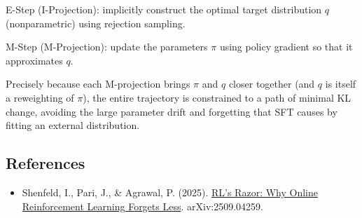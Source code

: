 E-Step (I-Projection): implicitly construct the optimal target distribution \(q\) (nonparametric) using rejection sampling.

M-Step (M-Projection): update the parameters \(\pi\) using policy gradient so that it approximates \(q\).

Precisely because each M-projection brings \(\pi\) and \(q\) closer together (and \(q\) is itself a reweighting of \(\pi\)), the entire trajectory is constrained to a path of minimal KL change, avoiding the large parameter drift and forgetting that SFT causes by fitting an external distribution.

\FloatBarrier
{}
\hypertarget{references-87}{%
\subsection{References}\label{references-87}}

\vspace{0.25em}
\begin{itemize}
\tightlist
\item
  Shenfeld, I., Pari, J., \& Agrawal, P. (2025). \href{https://arxiv.org/abs/2509.04259}{RL's Razor: Why Online Reinforcement Learning Forgets Less}. arXiv:2509.04259.
\end{itemize}

\clearpage
